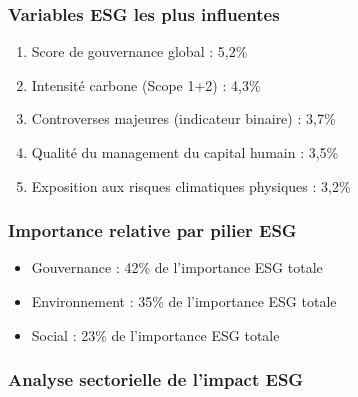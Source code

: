 \subsubsection{Variables ESG les plus influentes}
\begin{enumerate}
  \item Score de gouvernance global : 5,2\%
  \item Intensité carbone (Scope 1+2) : 4,3\%
  \item Controverses majeures (indicateur binaire) : 3,7\%
  \item Qualité du management du capital humain : 3,5\%
  \item Exposition aux risques climatiques physiques : 3,2\%
\end{enumerate}

\subsubsection{Importance relative par pilier ESG}
\begin{itemize}
  \item Gouvernance : 42\% de l'importance ESG totale
  \item Environnement : 35\% de l'importance ESG totale
  \item Social : 23\% de l'importance ESG totale
\end{itemize}

\subsubsection{Analyse sectorielle de l'impact ESG}

